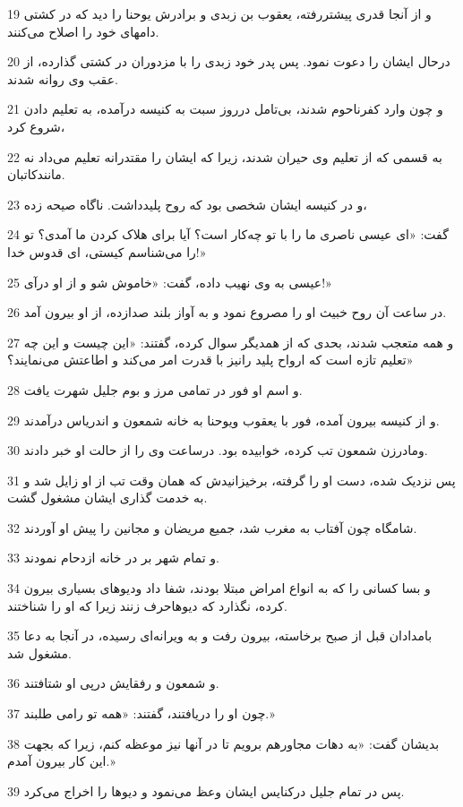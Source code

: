 \par 19 و از آنجا قدری پیشتررفته، یعقوب بن زبدی و برادرش یوحنا را دید که در کشتی دامهای خود را اصلاح می‌کنند.
\par 20 درحال ایشان را دعوت نمود. پس پدر خود زبدی را با مزدوران در کشتی گذارده، از عقب وی روانه شدند.
\par 21 و چون وارد کفرناحوم شدند، بی‌تامل درروز سبت به کنیسه درآمده، به تعلیم دادن شروع کرد،
\par 22 به قسمی که از تعلیم وی حیران شدند، زیرا که ایشان را مقتدرانه تعلیم می‌داد نه مانندکاتبان.
\par 23 و در کنیسه ایشان شخصی بود که روح پلیدداشت. ناگاه صیحه زده،
\par 24 گفت: «ای عیسی ناصری ما را با تو چه‌کار است؟ آیا برای هلاک کردن ما آمدی؟ تو را می‌شناسم کیستی، ای قدوس خدا!»
\par 25 عیسی به وی نهیب داده، گفت: «خاموش شو و از او درآی!»
\par 26 در ساعت آن روح خبیث او را مصروع نمود و به آواز بلند صدازده، از او بیرون آمد.
\par 27 و همه متعجب شدند، بحدی که از همدیگر سوال کرده، گفتند: «این چیست و این چه تعلیم تازه است که ارواح پلید رانیز با قدرت امر می‌کند و اطاعتش می‌نمایند؟»
\par 28 و اسم او فور در تمامی مرز و بوم جلیل شهرت یافت.
\par 29 و از کنیسه بیرون آمده، فور با یعقوب ویوحنا به خانه شمعون و اندریاس درآمدند.
\par 30 ومادر‌زن شمعون تب کرده، خوابیده بود. درساعت وی را از حالت او خبر دادند.
\par 31 پس نزدیک شده، دست او را گرفته، برخیزانیدش که همان وقت تب از او زایل شد و به خدمت گذاری ایشان مشغول گشت.
\par 32 شامگاه چون آفتاب به مغرب شد، جمیع مریضان و مجانین را پیش او آوردند.
\par 33 و تمام شهر بر در خانه ازدحام نمودند.
\par 34 و بسا کسانی را که به انواع امراض مبتلا بودند، شفا داد ودیوهای بسیاری بیرون کرده، نگذارد که دیوهاحرف زنند زیرا که او را شناختند.
\par 35 بامدادان قبل از صبح برخاسته، بیرون رفت و به ویرانه‌ای رسیده، در آنجا به دعا مشغول شد.
\par 36 و شمعون و رفقایش در‌پی او شتافتند.
\par 37 چون او را دریافتند، گفتند: «همه تو رامی طلبند.»
\par 38 بدیشان گفت: «به دهات مجاورهم برویم تا در آنها نیز موعظه کنم، زیرا که بجهت این کار بیرون آمدم.»
\par 39 پس در تمام جلیل درکنایس ایشان وعظ می‌نمود و دیوها را اخراج می‌کرد.
